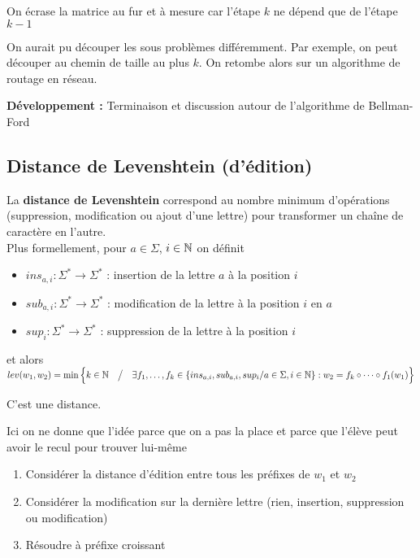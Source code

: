 \begin{rem}
	On écrase la matrice au fur et à mesure car l'étape $k$ ne dépend que de l'étape $k-1$
\end{rem}

\begin{rem}
	On aurait pu découper les sous problèmes différemment. Par exemple, on peut découper au chemin de taille au plus $k$. On retombe alors sur un algorithme de routage en réseau.
\end{rem}

\textbf{Développement :} Terminaison et discussion autour de l'algorithme de Bellman-Ford

\subsection{Distance de Levenshtein (d'édition)}

\begin{definition}
	La \textbf{distance de Levenshtein} correspond au nombre minimum d'opérations (suppression, modification ou ajout d'une lettre) pour transformer un chaîne de caractère en l'autre.\\
	
	Plus formellement, pour $a \in \Sigma$, $i \in \mathbb{N}$ on définit
	\begin{itemize}[label=$\star$]
		\item $ins_{a, i} : \Sigma^* \to \Sigma^*$ : insertion de la lettre $a$ à la position $i$
		\item $sub_{a, i} : \Sigma^* \to \Sigma^*$ : modification de la lettre à la position $i$ en $a$
		\item $sup_{i} : \Sigma^* \to \Sigma^*$ : suppression de la lettre à la position $i$
	\end{itemize}
	et alors $lev(w_1, w_2) = \min\Big\{ k \in \mathbb{N} \quad \big/ \quad \exists f_1, \dots, f_k \in \{ins_{a,i}, sub_{a,i}, sup_i / a\in \Sigma, i \in \mathbb{N} \} : w_2 = f_k \circ \dots \circ f_1 (w_1) \Big\}$ 
\end{definition}

\begin{exercise}
	C'est une distance.
\end{exercise}

\begin{com}
	Ici on ne donne que l'idée parce que on a pas la place et parce que l'élève peut avoir le recul pour trouver lui-même
\end{com}
\begin{algo}
	\begin{enumerate}
		\item Considérer la distance d'édition entre tous les préfixes de $w_1$ et $w_2$
		\item Considérer la modification sur la dernière lettre (rien, insertion, suppression ou modification)
		\item Résoudre à préfixe croissant
	\end{enumerate}
\end{algo}